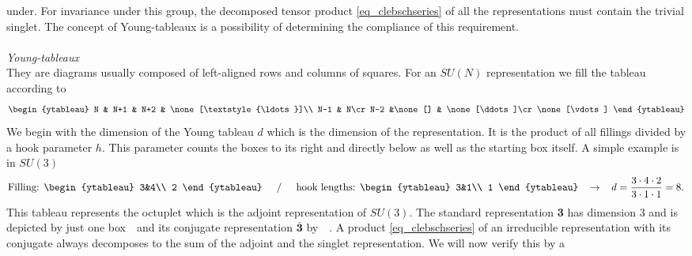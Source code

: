 under. For invariance under this group, the decomposed tensor product \eqref{eq_clebschseries} of all the representations must contain the trivial
singlet. The concept of Young-tableaux is a possibility of determining the compliance of this requirement. 
\\ \\ \textit{Young-tableaux}\\
\noindent They are diagrams usually composed of left-aligned rows and columns of squares. For an $SU(N)$ representation we fill the tableau according
to
\begingroup\makeatletter\def\f@size{5}\check@mathfonts\def\maketag@@@#1{\hbox{\m@th\large\normalfont#1}}
\begin{align*}
\begin{ytableau}
N & N+1 & N+2 & \none[\textstyle{\ldots}]\\
N-1 & N\cr
N-2 &\none[] & \none[\ddots]\cr
\none[\vdots]
\end{ytableau}
\end{align*}\endgroup
We begin with the dimension of the Young tableau $d$ which is the dimension of the representation. It is the product of all fillings 
divided by a hook parameter $h$. This parameter counts the boxes to its right and directly below as well as the starting
box itself. A simple example is in $SU(3)$
\begin{align*}
\text{Filling: }\begin{ytableau}
 3&4\\
 2
\end{ytableau}\hspace{0.5cm}/\hspace{0.5cm} \text{hook lengths: }\begin{ytableau}
 3&1\\
 1
\end{ytableau}\hspace{0.3cm}\rightarrow\hspace{0.3cm} d = \frac{3\cdot4\cdot2}{3\cdot 1\cdot 1} = 8.
\end{align*}
This tableau represents the octuplet which is the adjoint representation of $SU(3)$. The standard representation \textbf{3} has dimension 3 and is 
depicted by just one box \,\, and its conjugate representation $\bar{\textbf{3}}$ by \, \,. A product 
\eqref{eq_clebschseries} of an irreducible
representation with its conjugate always decomposes to the sum of the adjoint and the singlet representation. We will now verify this by a 
